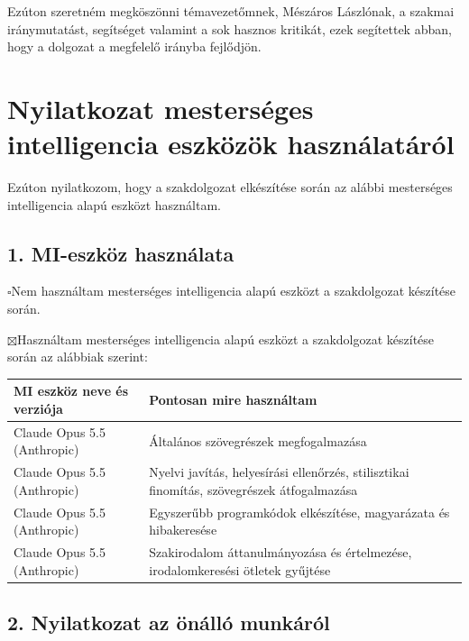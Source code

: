 \documentclass[a4paper,12pt,oneside]{article}
\begin{document}
Ezúton szeretném megköszönni témavezetőmnek, Mészáros Lászlónak, a szakmai iránymutatást, 
segítséget valamint a sok hasznos kritikát, ezek segítettek abban, hogy a dolgozat 
a megfelelő irányba fejlődjön.
\newpage
\section*{Nyilatkozat mesterséges intelligencia eszközök használatáról}

Ezúton nyilatkozom, hogy a szakdolgozat elkészítése során az alábbi mesterséges
intelligencia alapú eszközt használtam.

\subsection*{1. MI-eszköz használata}

\noindent$\square$\quad Nem használtam mesterséges intelligencia alapú eszközt a szakdolgozat
készítése során.

\noindent$\boxtimes$\quad Használtam mesterséges intelligencia alapú eszközt a szakdolgozat
készítése során az alábbiak szerint:

\medskip
\noindent\begin{tabular}{@{}p{}p{}@{}}
  \toprule
  \textbf{MI eszköz neve és verziója} & \textbf{Pontosan mire használtam} \\
  \midrule
  Claude Opus 5.5 (Anthropic) & Általános szövegrészek megfogalmazása \\
  Claude Opus 5.5 (Anthropic) & Nyelvi javítás, helyesírási ellenőrzés, stilisztikai finomítás,
                                szövegrészek átfogalmazása \\
  Claude Opus 5.5 (Anthropic) & Egyszerűbb programkódok elkészítése, magyarázata és hibakeresése \\
  Claude Opus 5.5 (Anthropic) & Szakirodalom áttanulmányozása és értelmezése, irodalomkeresési
                                ötletek gyűjtése \\
  \bottomrule
\end{tabular}

\subsection*{2. Nyilatkozat az önálló munkáról}
\end{document}
